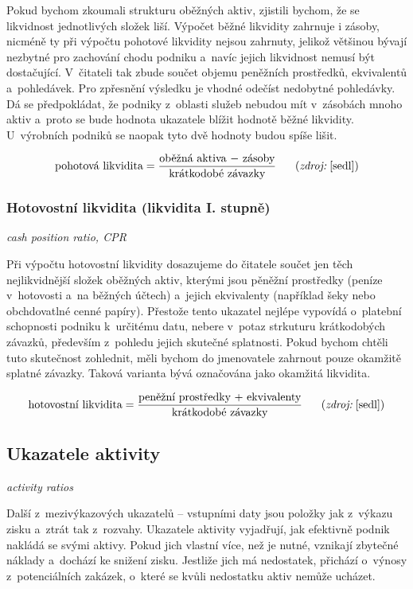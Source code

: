 Pokud bychom zkoumali strukturu oběžných aktiv, zjistili bychom, že se likvidnost jednotlivých složek liší. Výpočet běžné likvidity zahrnuje i zásoby, nicméně ty při výpočtu pohotové likvidity nejsou zahrnuty, jelikož většinou bývají nezbytné pro zachování chodu podniku a~navíc jejich likvidnost nemusí být dostačující.
V~čitateli tak zbude součet objemu peněžních prostředků, ekvivalentů a~pohledávek. Pro zpřesnění výsledku je vhodné odečíst nedobytné pohledávky.
Dá se předpokládat, že podniky z~oblasti služeb nebudou mít v~zásobách mnoho aktiv a~proto se bude hodnota ukazatele blížit hodnotě běžné likvidity. U~výrobních podniků se naopak tyto dvě hodnoty budou spíše lišit.

$$\vz{pohotová likvidita}{oběžná aktiva $-$ zásoby}{krátkodobé závazky} \scite{sedl}$$

\subsubsection{Hotovostní likvidita (likvidita I. stupně)}
\textit{cash position ratio, CPR}

Při výpočtu hotovostní likvidity dosazujeme do čitatele součet jen těch nejlikvidnější složek oběžných aktiv, kterými jsou pěněžní prostředky (peníze v~hotovosti a~na běžných účtech) a~jejich ekvivalenty (například šeky nebo obchdovatlné cenné papíry).
Přestože tento ukazatel nejlépe vypovídá o~platební schopnosti podniku k~určitému datu, nebere v~potaz strkuturu krátkodobých závazků, především z~pohledu jejich skutečné splatnosti.\cite{mendelu} Pokud bychom chtěli tuto skutečnost zohlednit, měli bychom do jmenovatele zahrnout pouze okamžitě splatné závazky. Taková varianta bývá označována jako okamžitá likvidita.


$$\vz{hotovostní likvidita}{peněžní prostředky $+$ ekvivalenty}{krátkodobé závazky} \scite{sedl}$$








\subsection{Ukazatele aktivity}
\textit{activity ratios}

Další z~mezivýkazových ukazatelů -- vstupními daty jsou položky jak z~výkazu zisku a~ztrát tak z~rozvahy. Ukazatele aktivity vyjadřují, jak efektivně podnik nakládá se svými aktivy. Pokud jich vlastní více, než je nutné, vznikají zbytečné náklady a~dochází ke snižení zisku. Jestliže jich má nedostatek, přichází o~výnosy z~potenciálních zakázek, o~které se kvůli nedostatku aktiv nemůže ucházet.

